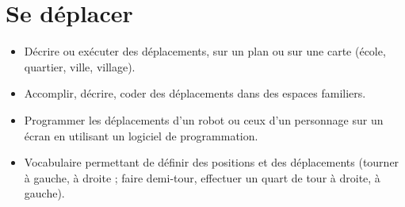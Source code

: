 
\themaG
\graphicspath{{../Ch13_Se_deplacer_sur_un_plan/Images/}}

\chapter{Se déplacer}
\label{C18}


\begin{prerequis}
   \begin{itemize}
      \item Décrire ou exécuter des déplacements, sur un plan ou sur une carte (école, quartier, ville, village).
      \item Accomplir, décrire, coder des déplacements dans des espaces familiers.
      \item Programmer les déplacements d’un robot ou ceux d’un personnage sur un écran en utilisant un logiciel de programmation.
      \item Vocabulaire permettant de définir des positions et des déplacements (tourner à gauche, à droite ; faire demi-tour, effectuer un quart de tour à droite, à gauche).
   \end{itemize}
\end{prerequis}

\vfill

